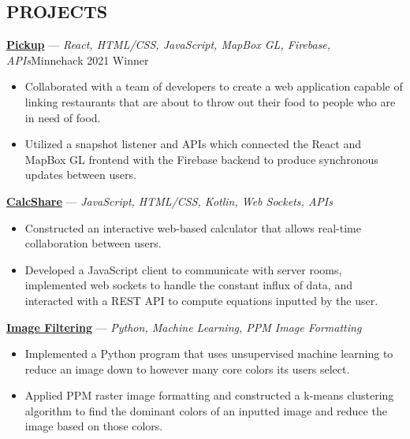 \documentclass[11pt]{res}
\begin{document}
\begin{footnotesize}
\begin{resume}
\begin{small}
\section{PROJECTS}
\end{small} 
\vspace{.5mm}
\href{https://devpost.com/software/pickup-7b8yhx}{\textbf{Pickup}} — {\sl React, HTML/CSS, JavaScript, MapBox GL, Firebase, APIs}\hfill Minnehack 2021 Winner\vspace{-5mm}
\begin{itemize}[leftmargin=6.25mm] \itemsep -2pt 
\item Collaborated with a team of developers to create a web application capable of linking restaurants that are about to throw out their food to people who are in need of food.
\vspace{1mm}
\item Utilized a snapshot listener and APIs which connected the React and MapBox GL frontend with the Firebase backend to produce synchronous updates between users. 
\end{itemize}
\vspace{-2.5mm}
\href{https://github.com/CharlesShi12/CalcShare}{\textbf{CalcShare}} — {\sl JavaScript, HTML/CSS, Kotlin, Web Sockets, APIs} \vspace{-5mm}
\begin{itemize}[leftmargin=6.25mm] \itemsep -2pt 
\item Constructed an interactive web-based calculator that allows real-time collaboration between users. 
\vspace{1mm}
\item Developed a JavaScript client to communicate with server rooms, implemented web sockets to handle the constant influx of data, and interacted with a REST API to compute equations inputted by the user. 
\end{itemize}
\vspace{-2.5mm}
\href{https://github.com/CharlesShi12/ImageFilters}{\textbf{Image Filtering}} — {\sl Python, Machine Learning, PPM Image Formatting} \vspace{-5mm}
\begin{itemize}[leftmargin=6.25mm] \itemsep -2pt 
\item Implemented a Python program that uses unsupervised machine learning to reduce an image down to however many core colors its users select.
\vspace{1mm}
\item Applied PPM raster image formatting and constructed a k-means clustering algorithm to find the dominant colors of an inputted image and reduce the image based on those colors. 
\end{itemize}
\begin{small}

\end{small}
\end{resume}
\end{footnotesize}
\end{document}
